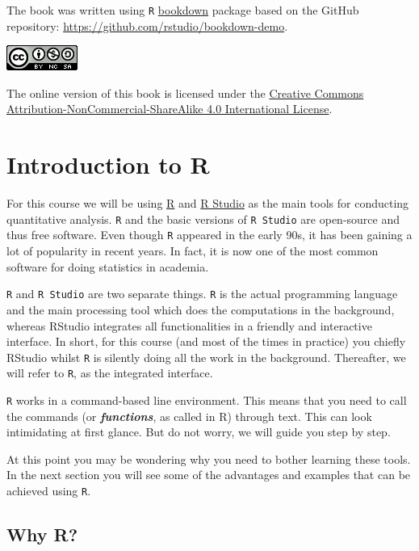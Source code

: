 \documentclass[
]{book}
\begin{document}
The book was written using \texttt{R} \href{https://github.com/rstudio/bookdown}{bookdown} package based on the GitHub repository: \url{https://github.com/rstudio/bookdown-demo}.

\includegraphics{./images/by-nc-sa.png}

The online version of this book is licensed under the \href{http://creativecommons.org/licenses/by-nc-sa/4.0/}{Creative Commons Attribution-NonCommercial-ShareAlike 4.0 International License}.

\hypertarget{lab-intro}{%
\chapter{Introduction to R}\label{lab-intro}}

For this course we will be using \href{https://www.r-project.org/}{R} \citep{R-base} and \href{https://rstudio.com/}{R Studio} as the main tools for conducting quantitative analysis. \texttt{R} and the basic versions of \texttt{R\ Studio} are open-source and thus free software. Even though \texttt{R} appeared in the early 90s, it has been gaining a lot of popularity in recent years. In fact, it is now one of the most common software for doing statistics in academia.

\texttt{R} and \texttt{R\ Studio} are two separate things. \texttt{R} is the actual programming language and the main processing tool which does the computations in the background, whereas RStudio integrates all functionalities in a friendly and interactive interface. In short, for this course (and most of the times in practice) you chiefly RStudio whilst \texttt{R} is silently doing all the work in the background. Thereafter, we will refer to \texttt{R}, as the integrated interface.

\texttt{R} works in a command-based line environment. This means that you need to call the commands (or \emph{\textbf{functions}}, as called in R) through text. This can look intimidating at first glance. But do not worry, we will guide you step by step.

At this point you may be wondering why you need to bother learning these tools. In the next section you will see some of the advantages and examples that can be achieved using \texttt{R}.

\hypertarget{why-r}{%
\section{Why R?}\label{why-r}}
\end{document}
